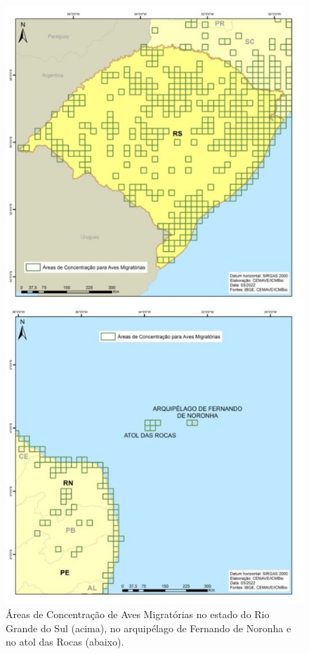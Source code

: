 \documentclass[
  oneside]{scrbook}
\begin{document}
\begin{figure}[H]

{\centering \includegraphics[width=0.7\linewidth]{imagens/cap07/Fig_24_RS_FN} 

}

\caption{Áreas de Concentração de Aves Migratórias no estado do Rio Grande do Sul (acima), no arquipélago de Fernando de Noronha e no atol das Rocas (abaixo).}\label{fig:44}
\end{figure}
\end{document}
